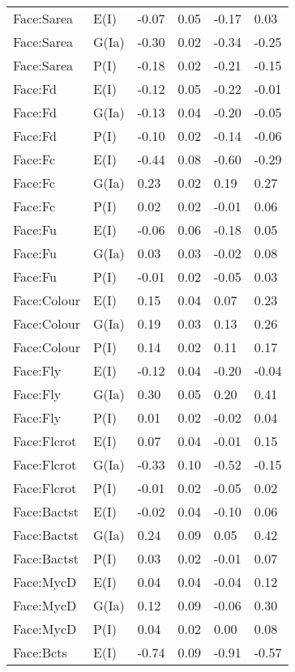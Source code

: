 \begin{center}
\begin{longtable}{|p{1.1in}|p{0.7in}|p{0.7in}|p{0.6in}|p{0.6in}|p{0.6in}|}
  Face:Sarea & E(I) & -0.07 & 0.05 & -0.17 & 0.03 \\ 
  Face:Sarea & G(Ia) & -0.30 & 0.02 & -0.34 & -0.25 \\ 
  Face:Sarea & P(I) & -0.18 & 0.02 & -0.21 & -0.15 \\ 
  Face:Fd & E(I) & -0.12 & 0.05 & -0.22 & -0.01 \\ 
  Face:Fd & G(Ia) & -0.13 & 0.04 & -0.20 & -0.05 \\ 
  Face:Fd & P(I) & -0.10 & 0.02 & -0.14 & -0.06 \\ 
  Face:Fc & E(I) & -0.44 & 0.08 & -0.60 & -0.29 \\ 
  Face:Fc & G(Ia) & 0.23 & 0.02 & 0.19 & 0.27 \\ 
  Face:Fc & P(I) & 0.02 & 0.02 & -0.01 & 0.06 \\ 
  Face:Fu & E(I) & -0.06 & 0.06 & -0.18 & 0.05 \\ 
  Face:Fu & G(Ia) & 0.03 & 0.03 & -0.02 & 0.08 \\ 
  Face:Fu & P(I) & -0.01 & 0.02 & -0.05 & 0.03 \\ 
  Face:Colour & E(I) & 0.15 & 0.04 & 0.07 & 0.23 \\ 
  Face:Colour & G(Ia) & 0.19 & 0.03 & 0.13 & 0.26 \\ 
  Face:Colour & P(I) & 0.14 & 0.02 & 0.11 & 0.17 \\ 
  Face:Fly & E(I) & -0.12 & 0.04 & -0.20 & -0.04 \\ 
  Face:Fly & G(Ia) & 0.30 & 0.05 & 0.20 & 0.41 \\ 
  Face:Fly & P(I) & 0.01 & 0.02 & -0.02 & 0.04 \\ 
  Face:Flcrot & E(I) & 0.07 & 0.04 & -0.01 & 0.15 \\ 
  Face:Flcrot & G(Ia) & -0.33 & 0.10 & -0.52 & -0.15 \\ 
  Face:Flcrot & P(I) & -0.01 & 0.02 & -0.05 & 0.02 \\ 
  Face:Bactst & E(I) & -0.02 & 0.04 & -0.10 & 0.06 \\ 
  Face:Bactst & G(Ia) & 0.24 & 0.09 & 0.05 & 0.42 \\ 
  Face:Bactst & P(I) & 0.03 & 0.02 & -0.01 & 0.07 \\ 
  Face:MycD & E(I) & 0.04 & 0.04 & -0.04 & 0.12 \\ 
  Face:MycD & G(Ia) & 0.12 & 0.09 & -0.06 & 0.30 \\ 
  Face:MycD & P(I) & 0.04 & 0.02 & 0.00 & 0.08 \\ 
  Face:Bcts & E(I) & -0.74 & 0.09 & -0.91 & -0.57 \\ 

\end{longtable}
\end{center}
